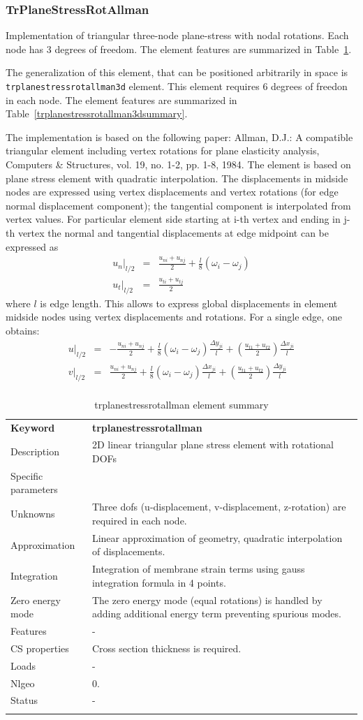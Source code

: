 \documentclass[a4paper]{article}
\newcommand{\param}[1]{\texttt{#1}} %
\newcommand{\del}[2]{\mbox{$\displaystyle\frac{#1}{#2}$}}
\newcommand{\templabel}{}%
\newcommand{\tempcaption}{}%
\newcounter{nelpar}
\newenvironment{elementsummary}[5]{%
  \gdef\tempcaption{#4}%
  \gdef\templabel{#5}%
  \setcounter{nelpar}{0}%
  \begin{center} %
    \begin{table}[!htb] %
      \begin{tabular}{|l|p{9cm}|}\hline %
        {\bf Keyword} & \bf{#1}\\ %
        {Description} & {#2}\\ %
        {Specific parameters} & {#3}\\ \hline %
}{
  \\ \hline %
      \end{tabular}%
      \caption{\tempcaption}%
      \label{\templabel}%
    \end{table}%
  \end{center}%
}
\newcommand{\elementDescription}[2]{{#1} & {#2}\\}
\begin{document}
\subsubsection{TrPlaneStressRotAllman}
Implementation of triangular three-node  plane-stress 
with nodal rotations.
Each node has 3 degrees of freedom. The element features are summarized in Table~\ref{TrPlaneStressRotAllmansummary}.

The generalization of this element, that can be positioned arbitrarily in space is \param{trplanestressrotallman3d} element. This element requires 6 degrees of freedon in each node. The element features are summarized in Table~\ref{trplanestressrotallman3dsummary}.


The implementation is based on the following paper: Allman, D.J.: A compatible triangular element including vertex rotations for plane elasticity analysis, Computers \& Structures, vol. 19, no. 1-2, pp. 1-8, 1984.
The element is based on plane stress element with quadratic interpolation. The displacements in midside nodes are expressed using vertex displacements and vertex rotations (for edge normal displacement component); 
the tangential component is interpolated from vertex values.
For particular element side starting at i-th vertex and ending in j-th vertex the normal and tangential displacements at edge midpoint can be expressed as
\begin{eqnarray*}
u_n\vert_{l/2} &=& \del{u_{ni}+u_{nj}}{2}+\del{l}{8}(\omega_i-\omega_j)\\
u_t\vert_{l/2} &=& \del{u_{ti}+u_{tj}}{2}
\end{eqnarray*}
where $l$ is edge length. This allows to express global displacements in element midside nodes using vertex displacements and rotations. For a single edge, one obtains:
\begin{eqnarray*}
u\vert_{l/2} &=&-\del{u_{ni}+u_{nj}}{2}+\del{l}{8}(\omega_i-\omega_j)\del{\Delta y_{ji}}{l}+(\del{u_{t1}+u_{t2}}{2})\del{\Delta x_{ji}}{l}\\
v\vert_{l/2} &=& \del{u_{ni}+u_{nj}}{2}+\del{l}{8}(\omega_i-\omega_j)\del{\Delta x_{ji}}{l}+(\del{u_{t1}+u_{t2}}{2})\del{\Delta y_{ji}}{l}\\
\end{eqnarray*}

\begin{elementsummary}{trplanestressrotallman}{2D linear triangular plane stress element with rotational DOFs}{}{trplanestressrotallman element summary}{TrPlaneStressRotAllmansummary}
\elementDescription{Unknowns}{Three dofs (u-displacement, v-displacement, z-rotation) are required in each node.}
\elementDescription{Approximation}{Linear approximation of geometry, quadratic interpolation of displacements.}
\elementDescription{Integration}{Integration of membrane strain terms using gauss integration formula in 4 points.}
\elementDescription{Zero energy mode}{The zero energy mode (equal rotations) is handled by adding additional energy term preventing spurious modes.}

\elementDescription{Features}{-}
\elementDescription{CS properties}{Cross section thickness is required.}
\elementDescription{Loads}{-}
\elementDescription{Nlgeo}{0.}
\elementDescription{Status}{-}
\end{elementsummary}
\end{document}
